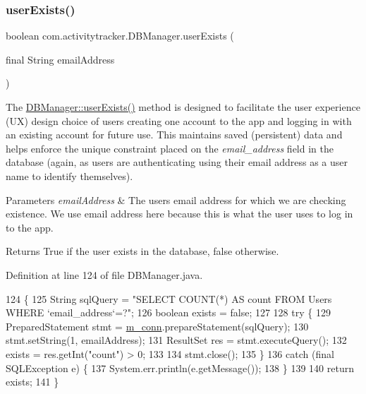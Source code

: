 \subsubsection{\texorpdfstring{user\+Exists()}{userExists()}}
{\footnotesize\ttfamily boolean com.\+activitytracker.\+D\+B\+Manager.\+user\+Exists (\begin{DoxyParamCaption}\item[{final String}]{email\+Address }\end{DoxyParamCaption})}

The \mbox{\hyperlink{classcom_1_1activitytracker_1_1_d_b_manager_af05d79f33ecf2920a67d1b9cf82c079f}{D\+B\+Manager\+::user\+Exists()}} method is designed to facilitate the user experience (UX) design choice of users creating one account to the app and logging in with an existing account for future use. This maintains saved (persistent) data and helps enforce the unique constraint placed on the {\itshape email\+\_\+address} field in the database (again, as users are authenticating using their email address as a user name to identify themselves).


\begin{DoxyParams}{Parameters}
{\em email\+Address} & The user\textquotesingle{}s email address for which we are checking existence. We use email address here because this is what the user uses to log in to the app. \\
\hline
\end{DoxyParams}
\begin{DoxyReturn}{Returns}
True if the user exists in the database, false otherwise. 
\end{DoxyReturn}


Definition at line 124 of file D\+B\+Manager.\+java.


\begin{DoxyCode}
124                                                           \{
125         String sqlQuery = \textcolor{stringliteral}{"SELECT COUNT(*) AS count FROM Users WHERE `email\_address`=?"};
126         \textcolor{keywordtype}{boolean} exists = \textcolor{keyword}{false};
127 
128         \textcolor{keywordflow}{try} \{
129             PreparedStatement stmt = \mbox{\hyperlink{classcom_1_1activitytracker_1_1_d_b_manager_a064088d13ac09eb147fdc19268771521}{m\_conn}}.prepareStatement(sqlQuery);
130             stmt.setString(1, emailAddress);
131             ResultSet res = stmt.executeQuery();
132             exists = res.getInt(\textcolor{stringliteral}{"count"}) > 0;
133 
134             stmt.close();
135         \}
136         \textcolor{keywordflow}{catch} (\textcolor{keyword}{final} SQLException e) \{
137             System.err.println(e.getMessage());
138         \}
139 
140         \textcolor{keywordflow}{return} exists;
141     \}
\end{DoxyCode}


